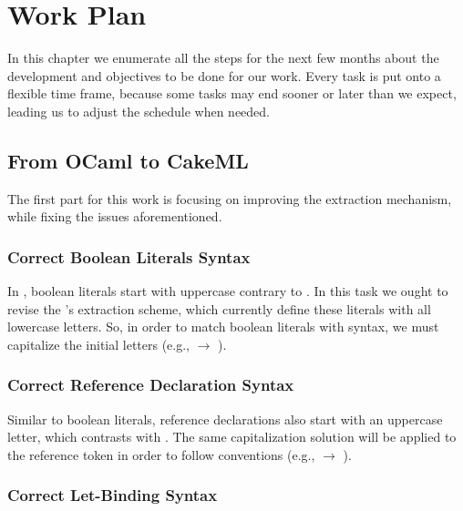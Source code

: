 
%

\chapter{Work Plan}
\label{cha:Work_Plan}

In this chapter we enumerate all the steps for the next few months about the development and objectives to be done for our work.
Every task is put onto a flexible time frame, because some tasks may end sooner or later than we expect, leading us to adjust the 
schedule when needed.

\section{From OCaml to CakeML}

The first part for this work is focusing on improving the extraction mechanism, while fixing the issues aforementioned.

\subsection{Correct Boolean Literals Syntax}

In \cml, boolean literals start with uppercase contrary to \ocaml. In this task we ought to revise the \whythree's extraction scheme,
which currently define these literals with all lowercase letters. So, in order to match boolean literals with \cml syntax, we must
capitalize the initial letters (e.g.,  $\rightarrow$ ).

\subsection{Correct Reference Declaration Syntax}

Similar to boolean literals, reference declarations also start with an uppercase letter, which contrasts with \ocaml. The same 
capitalization solution will be applied to the reference token in order to follow \cml conventions 
(e.g.,  $\rightarrow$ ).

\subsection{Correct Let-Binding Syntax}

